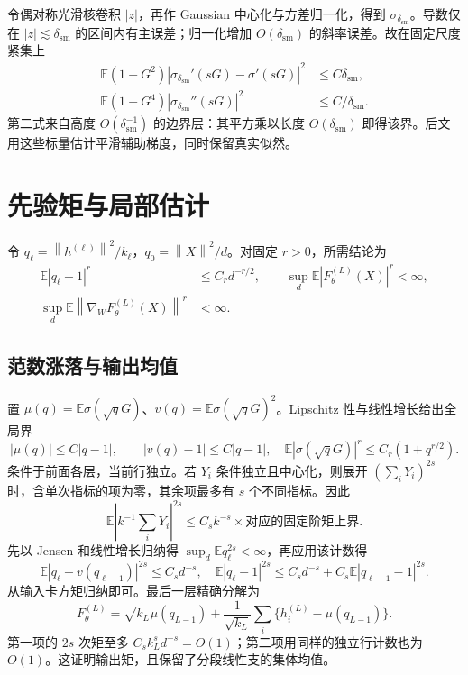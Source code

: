 \documentclass[a4paper]{tufte-handout}
\newcommand{\E}{\mathbb E}
\newcommand{\dsm}{\delta_{\mathrm{sm}}}
\newcommand{\norm}[1]{\left\|#1\right\|}
\begin{document}
\begin{fullwidth}
令偶对称光滑核卷积 $|z|$，再作 Gaussian 中心化与方差归一化，得到 $\sigma_{\dsm}$。导数仅在 $|z|\lesssim\dsm$ 的区间内有主误差；归一化增加 $O(\dsm)$ 的斜率误差。故在固定尺度紧集上
\begin{equation}\begin{aligned}
\E(1+G^2)|\sigma_{\dsm}'(sG)-\sigma'(sG)|^2&\le C\dsm,\\
\E(1+G^4)|\sigma_{\dsm}''(sG)|^2&\le C/\dsm.
\end{aligned}\end{equation}
第二式来自高度 $O(\dsm^{-1})$ 的边界层：其平方乘以长度 $O(\dsm)$ 即得该界。后文用这些标量估计平滑辅助梯度，同时保留真实似然。

\section{先验矩与局部估计}
令 $q_\ell=\norm{h^{(\ell)}}^2/k_\ell$，$q_0=\norm X^2/d$。对固定 $r>0$，所需结论为
\begin{equation}\label{eq:moments}\begin{aligned}
\E|q_\ell-1|^r&\le C_r d^{-r/2},\qquad
\sup_d\E|F_\theta^{(L)}(X)|^r<\infty,\\
\sup_d\E\norm{\nabla_WF_\theta^{(L)}(X)}^r&<\infty.
\end{aligned}\end{equation}

\subsection{范数涨落与输出均值}
置 $\mu(q)=\E\sigma(\sqrt qG)$、$v(q)=\E\sigma(\sqrt qG)^2$。Lipschitz 性与线性增长给出全局界
\[
|\mu(q)|\le C|q-1|,\qquad |v(q)-1|\le C|q-1|,
\quad \E|\sigma(\sqrt qG)|^r\le C_r(1+q^{r/2}).
\]
条件于前面各层，当前行独立。若 $Y_i$ 条件独立且中心化，则展开 $(\sum_iY_i)^{2s}$ 时，含单次指标的项为零，其余项最多有 $s$ 个不同指标。因此
\[
\E\left|k^{-1}\sum_iY_i\right|^{2s}
\le C_s k^{-s}\times\text{对应的固定阶矩上界}.
\]
先以 Jensen 和线性增长归纳得 $\sup_d\E q_\ell^{2s}<\infty$，再应用该计数得
\[
\E|q_\ell-v(q_{\ell-1})|^{2s}\le C_s d^{-s},
\quad
\E|q_\ell-1|^{2s}\le C_sd^{-s}+C_s\E|q_{\ell-1}-1|^{2s}.
\]
从输入卡方矩归纳即可。最后一层精确分解为
\[
F_\theta^{(L)}=\sqrt{k_L}\mu(q_{L-1})+
\frac1{\sqrt{k_L}}\sum_i\{h_i^{(L)}-\mu(q_{L-1})\}.
\]
第一项的 $2s$ 次矩至多 $C_sk_L^s d^{-s}=O(1)$；第二项用同样的独立行计数也为 $O(1)$。这证明输出矩，且保留了分段线性支的集体均值。


\end{fullwidth}
\end{document}

